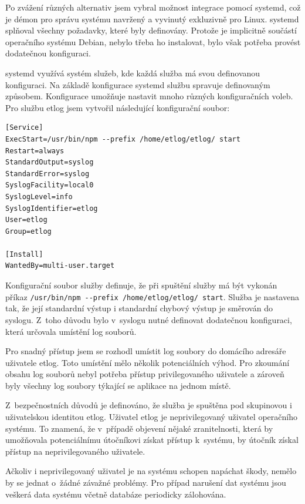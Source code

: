 \documentclass[thesis=M,czech]{FITthesis}[2012/06/26]
\begin{document}
    Po zvážení různých alternativ jsem vybral možnost integrace pomocí systemd, což
    je démon pro správu systému navržený a vyvinutý exkluzivně pro Linux.
    systemd splňoval všechny požadavky, které byly definovány.
    Protože je implicitně součástí operačního systému Debian, nebylo třeba ho instalovat,
    bylo však potřeba provést dodatečnou konfiguraci.

    systemd využívá systém služeb, kde každá služba má svou definovanou konfiguraci.
    Na základě konfigurace systemd službu spravuje definovaným způsobem.
    Konfigurace umožňuje nastavit mnoho různých konfiguračních voleb.
    Pro službu etlog jsem vytvořil následující konfigurační soubor:

    \begin{verbatim}
[Service]
ExecStart=/usr/bin/npm --prefix /home/etlog/etlog/ start
Restart=always
StandardOutput=syslog
StandardError=syslog
SyslogFacility=local0
SyslogLevel=info
SyslogIdentifier=etlog
User=etlog
Group=etlog

[Install]
WantedBy=multi-user.target
    \end{verbatim}

    Konfigurační soubor služby definuje, že při spuštění služby má být vykonán příkaz
    \verb|/usr/bin/npm --prefix /home/etlog/etlog/ start|.
    Služba je nastavena tak, že její standardní výstup i standardní chybový výstup je směrován do syslogu. 
    Z~toho důvodu bylo v~syslogu nutné definovat dodatečnou konfiguraci, 
    která určovala umístění log souborů.
    
    Pro snadný přístup jsem se rozhodl umístit log soubory do domácího
    adresáře uživatele etlog.
    Toto umístění mělo několik potenciálních výhod.
    Pro zkoumání obsahu log souborů nebyl potřeba přístup privilegovaného uživatele
    a zároveň byly všechny log soubory týkající se aplikace na jednom místě.

    Z~bezpečnostních důvodů je definováno, že služba je spuštěna pod skupinovou i uživatelskou identitou etlog.
    Uživatel etlog je neprivilegovaný uživatel operačního systému.
    To znamená, že v~případě objevení nějaké zranitelnosti,
    která by umožňovala potenciálnímu útočníkovi získat přístup k~systému,
    by útočník získal přístup na neprivilegovaného uživatele.

    Ačkoliv i neprivilegovaný uživatel je na systému schopen napáchat škody,
    nemělo by se jednat o~žádné závažné problémy.
    Pro případ narušení dat systému jsou veškerá
    data systému včetně databáze periodicky zálohována.
\end{document}
